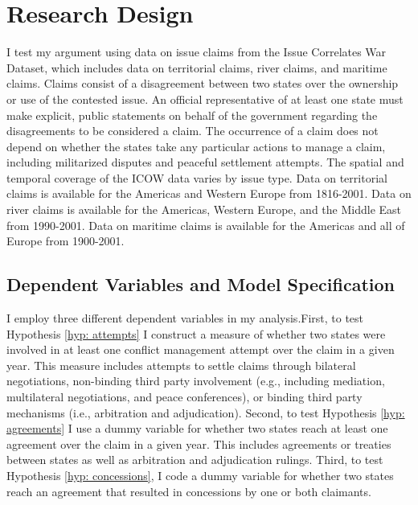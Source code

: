 \documentclass[../../dissertation.tex]{subfiles}
\begin{document}

\section{Research Design}

I test my argument using data on issue claims from the Issue Correlates War Dataset, which includes data on territorial claims, river claims, and maritime claims. Claims consist of a disagreement between two states over the ownership or use of the contested issue. An official representative of at least one state must make explicit, public statements on behalf of the government regarding the disagreements to be considered a claim. The occurrence of a claim does not depend on whether the states take any particular actions to manage a claim, including militarized disputes and peaceful settlement attempts. The spatial and temporal coverage of the ICOW data varies by issue type. Data on territorial claims is available for the Americas and Western Europe from 1816-2001. Data on river claims is available for the Americas, Western Europe, and the Middle East from 1990-2001. Data on maritime claims is available for the Americas and all of Europe from 1900-2001.

\subsection{Dependent Variables and Model Specification}

I employ three different dependent variables in my analysis.First, to test Hypothesis \ref{hyp: attempts} I construct a measure of whether two states were involved in at least one conflict management attempt over the claim in a given year. This measure includes attempts to settle claims through bilateral negotiations, non-binding third party involvement (e.g., including mediation, multilateral negotiations, and peace conferences), or binding third party mechanisms (i.e., arbitration and adjudication). Second, to test Hypothesis \ref{hyp: agreements} I use a dummy variable for whether two states reach at least one agreement over the claim in a given year. This includes agreements or treaties between states as well as arbitration and adjudication rulings. Third, to test Hypothesis \ref{hyp: concessions}, I code a dummy variable for whether two states reach an agreement that resulted in concessions by one or both claimants.
\end{document}

